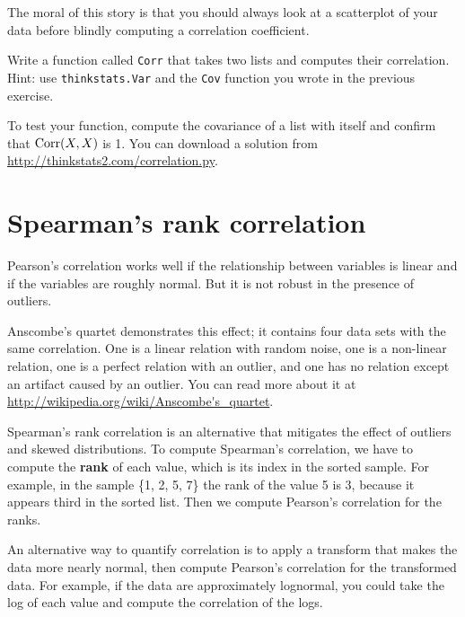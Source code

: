 \documentclass[12pt]{book}
\begin{document}
The moral of this story is that you should always look at a scatterplot of
your data before blindly computing a correlation coefficient.

\begin{exercise}
Write a function called {\tt Corr} that takes two lists and
computes their correlation.  Hint: use {\tt thinkstats.Var} and
the {\tt Cov} function you wrote in the previous exercise.

To test your function, compute the covariance of a list with itself
and confirm that $\mathrm{Corr}(X, X)$ is 1.  You can download a solution
from \url{http://thinkstats2.com/correlation.py}.

\end{exercise}


\section{Spearman's rank correlation}

Pearson's correlation works well if the relationship between variables
is linear and if the variables are roughly normal.  But it is not
robust in the presence of outliers.

Anscombe's quartet demonstrates this effect; it contains four data
sets with the same correlation.  One is a linear relation with random
noise, one is a non-linear relation, one is a perfect relation with an
outlier, and one has no relation except an artifact caused by an
outlier.  You can read more about it at
\url{http://wikipedia.org/wiki/Anscombe's_quartet}.

Spearman's rank correlation is an alternative that mitigates the
effect of outliers and skewed distributions.  To compute Spearman's
correlation, we have to compute the {\bf rank} of each value, which is its
index in the sorted sample.  For example, in the sample \{1, 2, 5, 7\}
the rank of the value 5 is 3, because it appears third in the sorted
list.  Then we compute Pearson's correlation for the ranks.

An alternative way to quantify correlation is to apply a transform
that makes the data more nearly normal, then compute Pearson's
correlation for the transformed data.  For example, if the data are
approximately lognormal, you could take the log of each value and
compute the correlation of the logs.  
\end{document}
